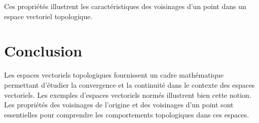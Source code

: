 \documentclass{article}
\begin{document}
Ces propriétés illustrent les caractéristiques des voisinages d'un point dans un espace vectoriel topologique.

\section{Conclusion}

Les espaces vectoriels topologiques fournissent un cadre mathématique permettant d'étudier la convergence et la continuité dans le contexte des espaces vectoriels. Les exemples d'espaces vectoriels normés illustrent bien cette notion. Les propriétés des voisinages de l'origine et des voisinages d'un point sont essentielles pour comprendre les comportements topologiques dans ces espaces.
\end{document}
